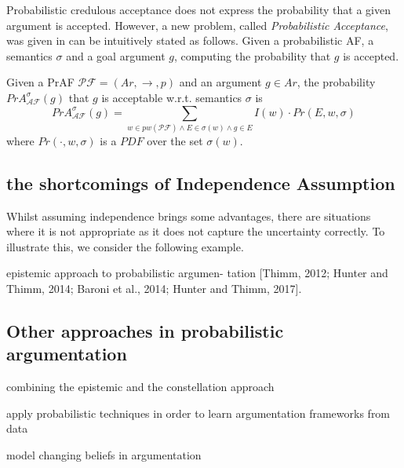 Probabilistic credulous acceptance does not express the probability that a given argument is accepted. 
% 
However, 
a new problem, called \textit{Probabilistic Acceptance}, 
was given in \cite{Alf.Cal.Gre.Par.Tru2020} can be intuitively stated as follows.
% 
Given a probabilistic AF, 
a semantics $\sigma$ and a goal argument $g$, 
computing the probability that $g$ is accepted. 



\begin{df}
    Given a PrAF $\mathcal{PF}=(Ar,\to,p)$ and an argument $g \in Ar$, 
    the probability $PrA^\sigma_\mathcal{AF}(g)$ that $g$ is acceptable w.r.t. semantics $\sigma$ is
    \[
        PrA^\sigma_\mathcal{AF}(g)
        =
        \sum_{w \in pw(\mathcal{PF}) \land E \in \sigma(w) \land g \in E} I(w) \cdot Pr(E,w,\sigma)
    \]
    where $Pr(\cdot,w,\sigma)$ is a $PDF$ over the set $\sigma(w)$.
\end{df}







\subsection{the shortcomings of Independence Assumption}


Whilst assuming independence brings some advantages, 
there are situations where it is not appropriate as it does not capture the uncertainty correctly. 
To illustrate this, 
we consider the following example.
























\vspace{3em}

\dotfill




epistemic approach to probabilistic argumen- tation [Thimm, 2012; Hunter and Thimm, 2014; Baroni et al., 2014; Hunter and Thimm, 2017].





\subsection{Other approaches in probabilistic argumentation}


combining the epistemic and the constellation approach

apply probabilistic techniques in order to learn argumentation frameworks from data

model changing beliefs in argumentation




